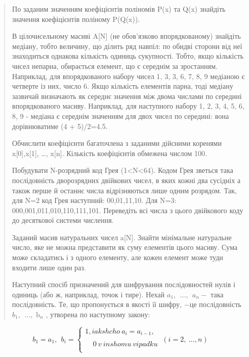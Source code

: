 \documentclass[]{article}
\begin{document}
\begin{quote}
По заданим значенням коефіцієнтів поліномів P(x) та Q(x) знайдіть
значення коефіцієнтів поліному P(Q(x)).

В цілочисельному масиві A{[}N{]} (не обов'язково впорядкованому)
знайдіть медіану, тобто величину, що ділить ряд навпіл: по обидві
сторони від неї знаходиться однакова кількість одиниць сукупності.
Тобто, якщо кількість чисел непарна, обирається елемент, що є середнім
за зростанням. Наприклад, для впорядкованого набору чисел 1, 3, 3, 6, 7,
8, 9 медіаною є четверте із них, число 6. Якщо кількість елементів
парна, тоді медіану зазвичай визначають як середнє значення між двома
числами по середині впорядкованого масиву. Наприклад, для наступного
набору 1, 2, 3, 4, 5, 6, 8, 9 - медіана є середнім значенням для двох
чисел по середині: вона дорівнюватиме (4 + 5)/2=4.5.

Обчислити коефіцієнти багаточлена з заданими дійсними коренями
x{[}0{]},x{[}1{]}, \ldots{}, x{[}n{]}. Кількість коефіцієнтів обмежена
числом 100.

Побудувати N-розрядний код Грея (1\textless{}N\textless{}64). Кодом Грея
зветься така послідовність дворозрядних двійкових чисел, в яких кожні
два сусідніх а також перше й останнє числа відрізняються лише одним
розрядом. Так, для N=2 код Грея наступний: 00,01,11,10. Для N=3:
000,001,011,010,110,111,101. Переведіть всі числа з цього двійкового
коду до десяткової системи числення.

Заданий масив натуральних чисел a{[}N{]}. Знайти мінімальне натуральне
число, яке не можна представити як суму елементів цього масиву. Сума
може складатись і з одного елементу, але кожен елемент може туди входити
лише один раз.

Наступний спосіб призначений для шифрування послідовностей нулів і
одиниць (або ж, наприклад, точок і тире). Нехай
\(a_{1},\ \ \ldots,\ \ a_{n} -\) така послідовність. Те, що пропонується
в якості її шифру, \(-\)це послідовність
\(b_{1},\ \ \ldots,\text{\ b}_{n}\) , утворена по наступному закону:
\end{quote}

\[b_{1} = a_{1},\ \ b_{i} = \left\{ \begin{matrix}
1,iakshcho\ a_{i} = a_{i - 1}, \\
 \\
\ \ \ \ \ 0\ v\ inshomu\ vipadku \\
\end{matrix} \right.\ \left( i = 2,\ ...,n \right)\]
\end{document}
